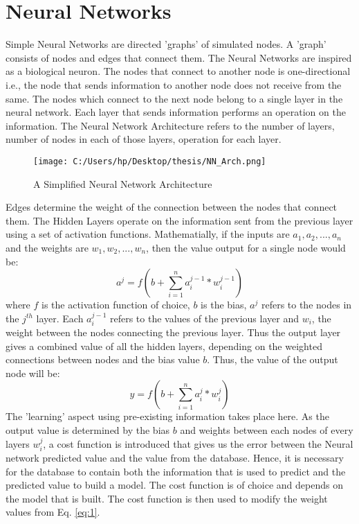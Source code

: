 \documentclass[11pt,a4paper]{report}
\begin{document}
{\section{Neural Networks} \label{NN}
\large
	Simple Neural Networks are directed 'graphs' of simulated nodes. A 'graph' consists of nodes and edges that connect them. The Neural Networks are inspired as a biological neuron. The nodes that connect to another node is one-directional i.e., the node that sends information to another node does not receive from the same. The nodes which connect to the next node belong to a single layer in the neural network. Each layer that sends information performs an operation on the information. The Neural Network Architecture refers to the number of layers, number of nodes in each of those layers, operation for each layer. 
\begin{figure} [H]
\centering
\texttt{[image: C:/Users/hp/Desktop/thesis/NN\_Arch.png]}
\caption{A Simplified Neural Network Architecture}
\end{figure}

Edges determine the weight of the connection between the nodes that connect them. The Hidden Layers operate on the information sent from the previous layer using a set of activation functions. Mathematially, if the inputs are $a_1,a_2,...,a_n$ and the weights are $w_1,w_2,...,w_n$, then the value output for a single node would be:
\begin{equation} 
a^j=f( b+ \sum_{i=1}^{n}{a_i^{j-1}*w_i^{j-1}} )
\end{equation}
where $f$ is the activation function of choice, $b$ is the bias, $a^j$ refers to the nodes in the $j^{th}$ layer. Each $a_i^{j-1}$ refers to the values of the previous layer and $w_i$, the weight between the nodes connecting the previous layer. Thus the output layer gives a combined value of all the hidden layers, depending on the weighted connections between nodes and the bias value $b$. Thus, the value of the output node will be:
\begin{equation} \label{eq:1}
y=f( b+ \sum_{i=1}^{n}{a_i^{j}*w_i^{j}})
\end{equation}
The 'learning' aspect using pre-existing information takes place here. As the output value is determined by the bias $b$ and weights between each nodes of every layers $w^{j}_i$, a cost function is introduced that gives us the error between the Neural network predicted value and the value from the database. Hence, it is necessary for the database to contain both the information that is used to predict and the predicted value to build a model. The cost function is of choice and depends on the model that is built. The cost function is then used to modify the weight values from Eq. \ref{eq:1}. 

}
\end{document}
